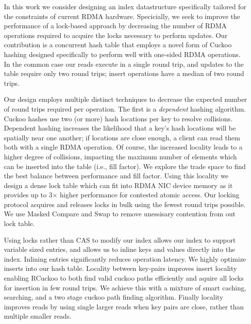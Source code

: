 In this work we consider designing an index datastructure specifically
tailored for the constraints of current RDMA hardware.  Specicially,
we seek to improve the performance of a lock-based approach by
decreasing the number of RDMA operations required to acquire the locks
necessary to perform updates.  Our contribution is a concurrent hash
table that employs a novel form of Cuckoo hashing designed
specifically to perform well with one-sided RDMA operations. In the
common case our reads execute in a single round trip, and updates to
the table require only two round trips; insert operations have a median
of two round trips.

Our design employs multiple distinct techniques to decrease the expected number of round trips required per operation.  The first is a
\emph{dependent} hashing algorithm. Cuckoo hashes use two (or more)
hash locations per key to resolve collisions. Dependent
hashing increases the likelihood that a key's hash locations
will be spatially near one another; if locations are close enough, a client can read them both with a single RDMA operation.  Of course, the increased locality
leads to a higher degree of collisions, impacting the maximum number of elements which can be inserted
into the table (i.e., fill factor).  We explore the trade space to find the best balance  between
performance and fill factor. Using this locality we design a
dense lock table which can fit into RDMA NIC device memory
as it provides up to 3$\times$ higher performance for contested
atomic access. Our locking protocol acquires and releases
locks in bulk using the fewest round trips possible. We use
Masked Compare and Swap to remove unessisary contention from
out lock table.

Using locks rather than CAS to modify our index allows our
index to support variable sized entries, and allows us to
inline keys and values directly into the index. Inlining
entries significantly reduces operation latency. We highly
optimize inserts into our hash table. Locality between
key-pairs improves insert locality enabling RCuckoo to both
find valid cuckoo paths efficiently and aquire all locks for
insertion in few round trips. We achieve this with a mixture
of smart caching, searching, and a two stage cuckoo path
finding algorithm. Finally locality improves reads by using
single larger reads when key pairs are close, rather than
multiple smaller reads.


